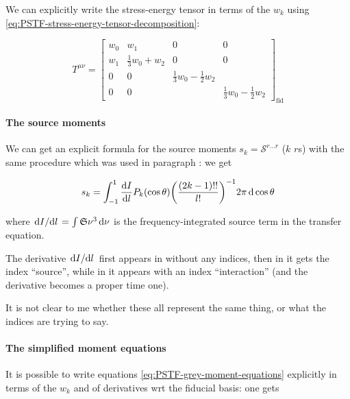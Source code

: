 \documentclass[main.tex]{subfiles}
\begin{document}
We can explicitly write the stress-energy tensor in terms of the \(w_k\) using \eqref{eq:PSTF-stress-energy-tensor-decomposition}:

\begin{equation} \label{eq:radiation-stress-energy-tensor-fiducial}
    T^{\mu\nu} = \begin{bmatrix}
    w_0   & w_1  & 0  & 0 \\
    w_1   & \frac{1}{3}w_0 + w_2  &  0  & 0 \\
      0 & 0  &  \frac{1}{3}w_0 -\frac{1}{2}w_2 &  \\
      0 & 0  &   & \frac{1}{3}w_0 -\frac{1}{2}w_2
  \end{bmatrix} _{\text{fid}}
\end{equation}

\paragraph{The source moments}

We can get an explicit formula for the source moments \(s_k = \mathscr S ^{r\dots r}\) (\(k\) \(r\)s) with the same procedure which was used in paragraph :
we get

\begin{equation}
    s_k = \int_{-1}^1 \dv{I}{l} (\cos \theta) P_k(\cos \theta) \qty(\frac{(2k-1)!!}{l!})^{-1} 2 \pi\dd{\cos \theta}
\end{equation}

where \(\dv*{I}{l} = \int \mathfrak S \nu^3 \dd{\nu}\) is the frequency-integrated  source term in the transfer equation.

\begin{greenbox}
  The derivative \(\dv*{I}{l}\) first appears in \cite[]{Thorne:1981feb} without any indices, then in \cite[section 6]{Thorne:1981feb} it gets the index ``source'', while in \cite[eq. 15]{ThorneFLammmangZytkow:1981feb} it appears with an index ``interaction'' (and the derivative becomes a proper time one).

  It is not clear to me whether these all represent the same thing, or what the indices are trying to say.
\end{greenbox}

\paragraph{The simplified moment equations}

It is possible to write equations \eqref{eq:PSTF-grey-moment-equations} explicitly in terms of the \(w_k\) and of derivatives wrt the fiducial basis: one gets \cite[eq. 5.10c]{Thorne:1981feb}
\end{document}
